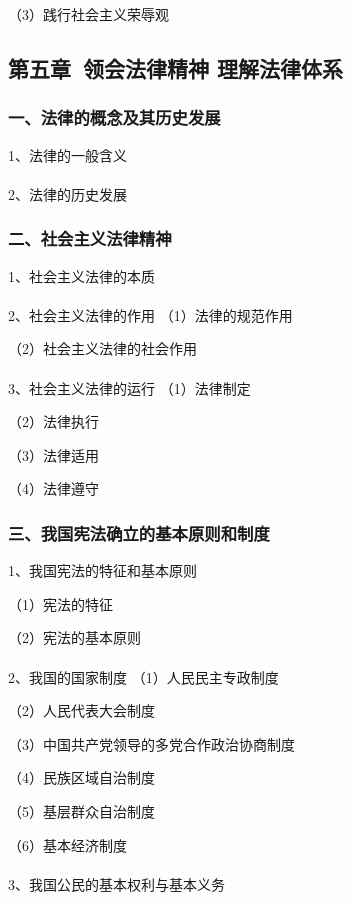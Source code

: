 \documentclass{ctexart}
\begin{document}
（3）践行社会主义荣辱观



\subsection{第五章\ 领会法律精神 理解法律体系}
\subsubsection{一、法律的概念及其历史发展}

1、法律的一般含义
\\\\

2、法律的历史发展

\subsubsection{二、社会主义法律精神}
1、社会主义法律的本质
\\\\

2、社会主义法律的作用
（1）法律的规范作用

（2）社会主义法律的社会作用
\\\\

3、社会主义法律的运行
（1）法律制定

（2）法律执行

（3）法律适用

（4）法律遵守

\subsubsection{三、我国宪法确立的基本原则和制度}
1、我国宪法的特征和基本原则

（1）宪法的特征

（2）宪法的基本原则
\\\\

2、我国的国家制度
（1）人民民主专政制度

（2）人民代表大会制度

（3）中国共产党领导的多党合作政治协商制度

（4）民族区域自治制度

（5）基层群众自治制度

（6）基本经济制度
\\\\

3、我国公民的基本权利与基本义务
\end{document}
